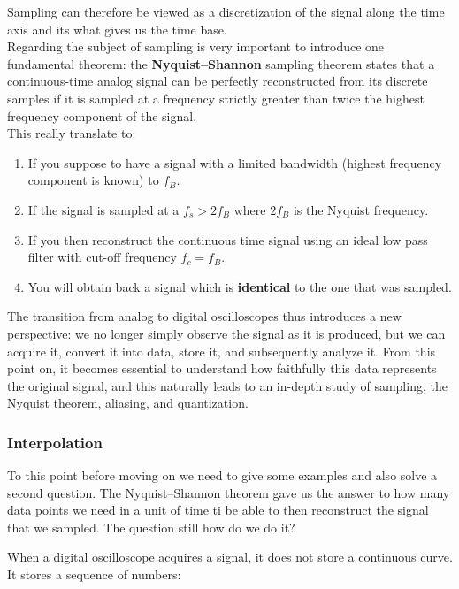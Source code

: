 \documentclass[../main.tex]{subfiles}
\begin{document}
Sampling can therefore be viewed as a discretization of the signal along the time axis and its what gives us the time base.\\

Regarding the subject of sampling is very important to introduce one fundamental theorem: the \textbf{Nyquist–Shannon} sampling theorem states that a continuous-time analog signal can be perfectly reconstructed from its discrete samples if it is sampled at a frequency strictly greater than twice the highest frequency component of the signal.\\

This really translate to:

\begin{enumerate}[label=\textbf{-}]
	\item If you suppose to have a signal with a limited bandwidth (highest frequency component is known) to $f_B$.
	\item If the signal is sampled at a $f_s > 2 f_B$ where $2f_B$ is the Nyquist frequency.
	\item If you then reconstruct the continuous time signal using an ideal low pass filter with cut-off frequency $f_c = f_B$.
	\item You will obtain back a signal which is \textbf{identical} to the one that was sampled. 
\end{enumerate}


The transition from analog to digital oscilloscopes thus introduces a new perspective: we no longer simply observe the signal as it is produced, but we can acquire it, convert it into data, store it, and subsequently analyze it. From this point on, it becomes essential to understand how faithfully this data represents the original signal, and this naturally leads to an in-depth study of sampling, the Nyquist theorem, aliasing, and quantization.

\subsubsection{Interpolation}

To this point before moving on we need to give some examples and also solve a second question. The Nyquist–Shannon theorem gave us the answer to how many data points we need in a unit of time ti be able to then reconstruct the signal that we sampled. The question still how do we do it? 

When a digital oscilloscope acquires a signal, it does not store a continuous curve. It stores a sequence of numbers:
\end{document}
